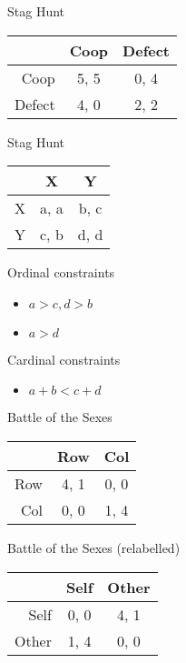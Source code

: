 \documentclass[
  ignorenonframetext,
]{beamer}
\providecommand{\tightlist}{%
  \setlength{\itemsep}{0pt}\setlength{\parskip}{0pt}}
\begin{document}
\begin{frame}{Stag Hunt}
\protect\hypertarget{stag-hunt}{}
\begin{table}[!h]
\centering
\begin{tabular}[t]{>{}r|cc}
\toprule
 & Coop & Defect\\
\midrule
Coop & 5, 5 & 0, 4\\
Defect & 4, 0 & 2, 2\\
\bottomrule
\end{tabular}
\end{table}
\end{frame}

\begin{frame}{Stag Hunt}
\protect\hypertarget{stag-hunt-1}{}
\begin{table}[!h]
\centering
\begin{tabular}[t]{>{}r|cc}
\toprule
 & X & Y\\
\midrule
X & a, a & b, c\\
Y & c, b & d, d\\
\bottomrule
\end{tabular}
\end{table}

Ordinal constraints

\begin{itemize}
\tightlist
\item
  \(a > c, d > b\)
\item
  \(a > d\)
\end{itemize}

Cardinal constraints

\begin{itemize}
\tightlist
\item
  \(a + b < c + d\)
\end{itemize}
\end{frame}

\begin{frame}{Battle of the Sexes}
\protect\hypertarget{battle-of-the-sexes}{}
\begin{table}[!h]
\centering
\begin{tabular}[t]{>{}r|cc}
\toprule
 & Row & Col\\
\midrule
Row & 4, 1 & 0, 0\\
Col & 0, 0 & 1, 4\\
\bottomrule
\end{tabular}
\end{table}
\end{frame}

\begin{frame}{Battle of the Sexes (relabelled)}
\protect\hypertarget{battle-of-the-sexes-relabelled}{}
\begin{table}[!h]
\centering
\begin{tabular}[t]{>{}r|cc}
\toprule
 & Self & Other\\
\midrule
Self & 0, 0 & 4, 1\\
Other & 1, 4 & 0, 0\\
\bottomrule
\end{tabular}
\end{table}
\end{frame}
\end{document}

